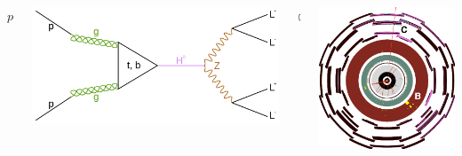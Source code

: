 \documentclass{beamer}
\begin{document}
\begin{frame}
    \centering
    \begin{columns}
        \begin{column}{0.1\textwidth}
            \centering
            $p =$
        \end{column}
        \begin{column}{0.4\textwidth}
            \centering
            \includegraphics[width=\textwidth]{figures/feynman.png}
        \end{column}
        \begin{column}{0.1\textwidth}
            \centering
             $\otimes$
        \end{column}
        \begin{column}{0.4\textwidth}
            \centering
            \includegraphics[width=\textwidth]{figures/atlas-sim.png}
        \end{column}
    \end{columns}

\end{frame}
\end{document}
